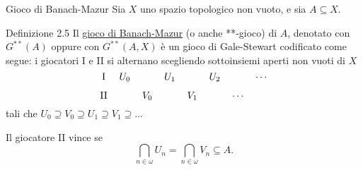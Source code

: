 \documentclass[babel]{beamer}
\renewcommand{\href}[2]{#2}
\begin{document}
\begin{frame}[label={sec:org838fb78}]{Gioco di Banach-Mazur}
Sia \(X\) uno \href{../../../../../../../org/roam/20250103145124-topologia.org}{spazio topologico} non vuoto, e sia \(A \subseteq X\).
\begin{block}{Definizione 2.5}
Il \uline{gioco di Banach-Mazur} (o anche **-gioco) di \(A\), denotato con \(G^{ * *}(A)\) oppure con \(G^{ * *}(A,X)\) è un \href{../../../../../../../org/roam/20250513155732-logic_game.org}{gioco} \href{../../../../../../../org/roam/20250513171520-giochi_di_gale_stewart.org}{di Gale-Stewart} codificato come segue: i giocatori I e II si alternano scegliendo sottoinsiemi aperti non vuoti di \(X\)
\begin{equation*}
\begin{tikzcd}[ampersand replacement=\&,cramped,sep=tiny]
	{\text{I}} \& {U_0} \&\& {U_1} \&\& {U_2} \&\& \cdots \\
	{\text{II}} \&\& {V_0} \&\& {V_1} \&\& \cdots
\end{tikzcd}
\end{equation*}
\href{../../../../../../../org/roam/20250513171520-giochi_di_gale_stewart.org}{tali che} \(U_{0}\supseteq V_{0}\supseteq U_{1}\supseteq V_{1}\supseteq \dots\)

Il giocatore II vince se
\begin{equation*}
\bigcap_{n \in \omega} U_{n} = \bigcap_{n \in \omega} V_{n} \subseteq A.
\end{equation*}
\end{block}
\end{frame}
\end{document}
